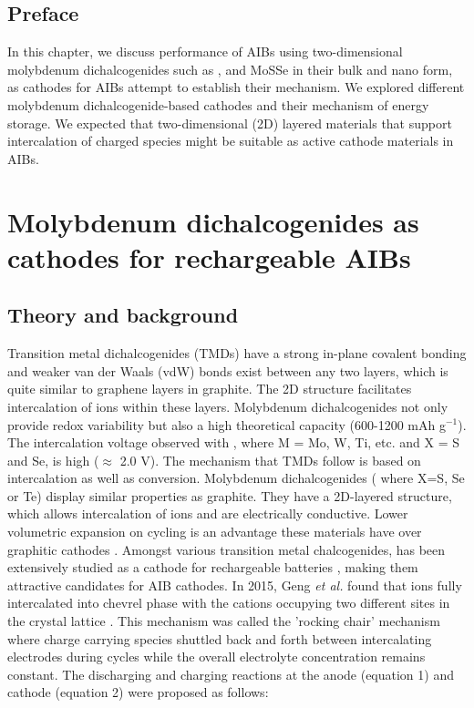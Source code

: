\section*{Preface}
In this chapter, we discuss performance of AIBs using two-dimensional molybdenum dichalcogenides such as ,  and MoSSe in their bulk and nano form, as cathodes for AIBs attempt to establish their mechanism. We explored different molybdenum dichalcogenide-based cathodes and their mechanism of energy storage. We expected that two-dimensional (2D) layered materials that support intercalation of charged species might be suitable as active cathode materials in AIBs. 
\pagebreak
\chapter{Molybdenum dichalcogenides as cathodes for rechargeable AIBs} %

\label{chap4} %

\section{Theory and background}
Transition metal dichalcogenides (TMDs) have a strong in-plane covalent bonding and weaker van der Waals (vdW) bonds exist between any two layers, which is quite similar to graphene layers in graphite. The 2D structure facilitates intercalation of ions within these layers. Molybdenum dichalcogenides not only provide redox variability but also a high theoretical capacity (600-1200 mAh g$^{-1}$). The intercalation voltage observed with , where M = Mo, W, Ti, etc. and X = S and Se, is high ($\approx$ 2.0 V). The mechanism that TMDs follow is based on intercalation as well as conversion. 
Molybdenum dichalcogenides ( where X=S, Se or Te) display similar properties as graphite. They have a 2D-layered structure, which allows intercalation of ions and are electrically conductive. Lower volumetric expansion on cycling is an advantage these materials have over graphitic cathodes \cite{liang_rechargeable_2011, huang_molybdenum_2019}. Amongst various transition metal chalcogenides,  has been extensively studied as a cathode for rechargeable batteries \cite{li_mos2_2004, zhu_fast_2015}, making them attractive candidates for AIB cathodes. In 2015, Geng \textit{et al.} found that  ions fully intercalated into chevrel phase  with the cations occupying two different sites in the crystal lattice \cite{geng_reversible_2015}. This mechanism was called the 'rocking chair' mechanism where charge carrying species shuttled back and forth between intercalating electrodes during cycles while the overall electrolyte concentration remains constant. The discharging and charging reactions at the anode (equation 1) and cathode (equation 2) were proposed as follows:

